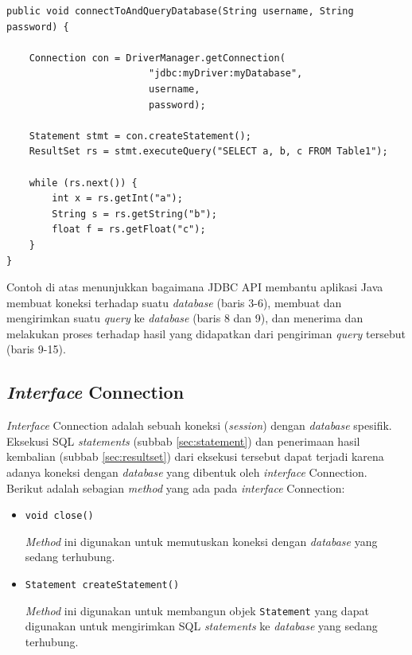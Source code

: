 \begin{lstlisting}
public void connectToAndQueryDatabase(String username, String password) {

    Connection con = DriverManager.getConnection(
                         "jdbc:myDriver:myDatabase",
                         username,
                         password);

    Statement stmt = con.createStatement();
    ResultSet rs = stmt.executeQuery("SELECT a, b, c FROM Table1");

    while (rs.next()) {
        int x = rs.getInt("a");
        String s = rs.getString("b");
        float f = rs.getFloat("c");
    }
}
\end{lstlisting}

Contoh di atas menunjukkan bagaimana JDBC API membantu aplikasi Java membuat koneksi terhadap suatu \textit{database} (baris 3-6), membuat dan mengirimkan suatu \textit{query} ke \textit{database} (baris 8 dan 9), dan menerima dan melakukan proses terhadap hasil yang didapatkan dari pengiriman \textit{query} tersebut (baris 9-15).

\subsection{\textit{Interface} Connection}
\label{sec:intercon}
\textit{Interface} Connection adalah sebuah koneksi (\textit{session}) dengan \textit{database} spesifik\cite{javadocumentation}. Eksekusi SQL \textit{statements} (subbab \ref{sec:statement}) dan penerimaan hasil kembalian (subbab \ref{sec:resultset}) dari eksekusi tersebut dapat terjadi karena adanya koneksi dengan \textit{database} yang dibentuk oleh \textit{interface} Connection. Berikut adalah sebagian \textit{method} yang ada pada \textit{interface} Connection:
\begin{itemize}
	\item \texttt{void close()}
	
	\textit{Method} ini digunakan untuk memutuskan koneksi dengan \textit{database} yang sedang terhubung.
	
	\item \texttt{Statement createStatement()}
	
	\textit{Method} ini digunakan untuk membangun objek \texttt{Statement} yang dapat digunakan untuk mengirimkan SQL \textit{statements} ke \textit{database} yang sedang terhubung.
\end{itemize}

